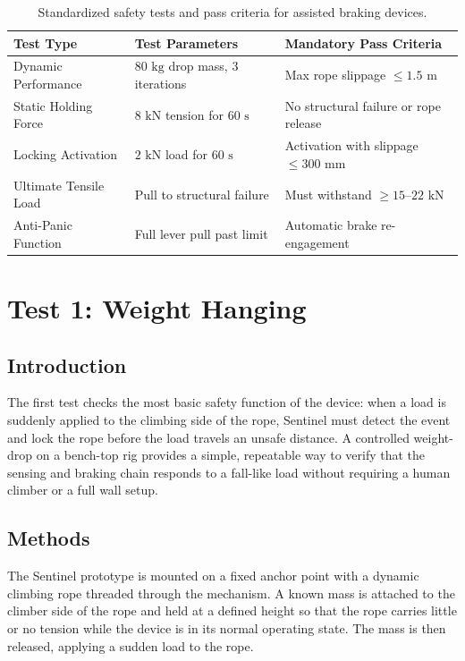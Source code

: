 \begin{table}[htbp]
\centering
\caption{Standardized safety tests and pass criteria for assisted braking devices.}
\label{tab:belay_safety_tests}
\begin{tabular}{lll}
\hline
\textbf{Test Type} & \textbf{Test Parameters} & \textbf{Mandatory Pass Criteria} \\ \hline
Dynamic Performance & $80\text{ kg}$ drop mass, 3 iterations & Max rope slippage $\le 1.5\text{ m}$ \\
Static Holding Force & $8\text{ kN}$ tension for $60\text{ s}$ & No structural failure or rope release \\
Locking Activation & $2\text{ kN}$ load for $60\text{ s}$ & Activation with slippage $\le 300\text{ mm}$ \\
Ultimate Tensile Load & Pull to structural failure & Must withstand $\ge 15\text{--}22\text{ kN}$ \cite{uiaa129, TFM_Sentinel_2026} \\
Anti-Panic Function & Full lever pull past limit & Automatic brake re-engagement \\ \hline
\end{tabular}
\end{table}

\section{Test 1: Weight Hanging}
\label{sec:test1-weight-hanging}

\subsection{Introduction}
\label{sec:test1-intro}

The first test checks the most basic safety function of the device: when
a load is suddenly applied to the climbing side of the rope, Sentinel
must detect the event and lock the rope before the load travels an unsafe
distance. A controlled weight-drop on a bench-top rig provides a simple,
repeatable way to verify that the sensing and braking chain responds to a
fall-like load without requiring a human climber or a full wall setup.

\subsection{Methods}
\label{sec:test1-methods}

The Sentinel prototype is mounted on a fixed anchor point with a dynamic
climbing rope threaded through the mechanism. A known mass is attached to
the climber side of the rope and held at a defined height so that the
rope carries little or no tension while the device is in its normal
operating state. The mass is then released, applying a sudden load to the
rope.

